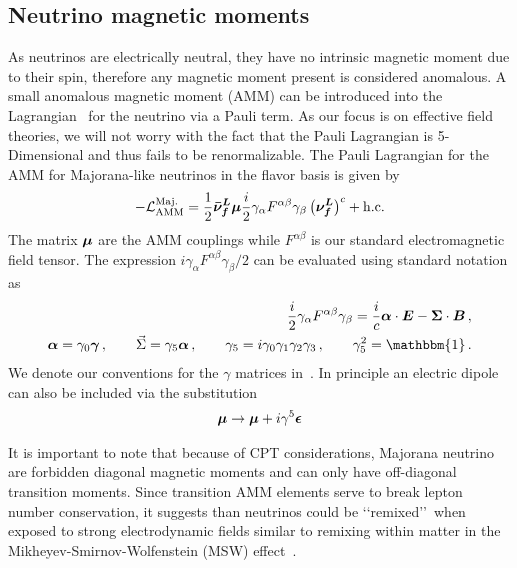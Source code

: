 \subsection{Neutrino magnetic moments}\label{sec:moment}
\noindent As neutrinos are electrically neutral, they have no intrinsic magnetic moment due to their spin, therefore any magnetic moment present is considered anomalous. A small anomalous magnetic moment (AMM) can be introduced into the Lagrangian~\citep{itzykson2012quantum,steinmetz2018magnetic} for the neutrino via a Pauli term. As our focus is on effective field theories, we will not worry with the fact that the Pauli Lagrangian is 5-Dimensional and thus fails to be renormalizable. The Pauli Lagrangian for the AMM for Majorana-like neutrinos in the flavor basis is given by
\begin{align}
	\label{moment:1} -\mathcal{L}_{\mathrm{AMM}}^{\rm Maj.}=\frac{1}{2}\boldsymbol{\bar{\nu}_{f}^{L}}\boldsymbol{\mu}\frac{i}{2}\gamma_{\alpha}F^{\alpha\beta}\gamma_{\beta}\left(\boldsymbol{\nu_{f}^{L}}\right)^{c}+\mathrm{h.c.}
\end{align}
The matrix $\boldsymbol{\mu}$ are the AMM couplings while $F^{\alpha\beta}$ is our standard electromagnetic field tensor. The expression $i\gamma_{\alpha}F^{\alpha\beta}\gamma_{\beta}/2$ can be evaluated using standard notation as
\begin{align}
	\label{convention:1}
    \frac{i}{2}\gamma_{\alpha}F^{\alpha\beta}\gamma_{\beta} = \frac{i}{c}\bb{\alpha}\cdot\bb{E}-\bb{\Sigma}\cdot\bb{B}\,,\\
	\label{convention:2}
    \bb{\alpha}=\gamma_{0}\bb{\gamma}\,,\qquad
    \vec{\Sigma}=\gamma_{5}\bb{\alpha}\,,\qquad
    \gamma_{5}=i\gamma_{0}\gamma_{1}\gamma_{2}\gamma_{3}\,,\qquad
    \gamma_{5}^{2}=\mathbbm{1}\,.
\end{align}
We denote our conventions for the $\gamma$ matrices in~. In principle an electric dipole can also be included via the substitution
\begin{align}
    \label{electric:1}
    \boldsymbol{\mu}\rightarrow\boldsymbol{\mu}+i\gamma^{5}\boldsymbol{\epsilon}
\end{align}

It is important to note that because of CPT considerations, Majorana neutrino are forbidden diagonal magnetic moments and can only have off-diagonal transition moments. Since transition AMM elements serve to break lepton number conservation, it suggests than neutrinos could be \lq\lq remixed\rq\rq\ when exposed to strong electrodynamic fields similar to remixing within matter in the Mikheyev-Smirnov-Wolfenstein (MSW) effect~\citep{wolfenstein1978neutrino,mikheev1985resonance,bethe1986possible,greiner2009gauge}. 

